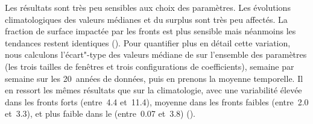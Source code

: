 \begin{table}
  \centering
  \caption[]{%
    Coefficients de normalisation pour les différents paramètres utilisés.
  }
  \label{tab:coefs}
\end{table}

Les résultats sont très peu sensibles aux choix des paramètres.
Les évolutions climatologiques des valeurs médianes et du surplus sont très peu affectés. La fraction de surface impactée par les fronts est plus sensible mais néanmoins les tendances restent identiques ().
Pour quantifier plus en détail cette variation, nous calculons l'écart"-type des valeurs médiane de  sur l'ensemble des paramètres (les trois tailles de fenêtres et trois configurations de coefficients), semaine par semaine sur les 20~années de données, puis en prenons la moyenne temporelle.
Il en ressort les mêmes résultats que sur la climatologie, avec une variabilité élevée dans les fronts forts (entre~\qty{4.4}{\mugm} et~\qty{11.4}{\mugm}), moyenne dans les fronts faibles (entre~\qty{2.0}{\mugm} et~\qty{3.3}{\mugm}), et plus faible dans le  (entre~\qty{0.07}{\mugm} et~\qty{3.8}{\mugm}) ().

